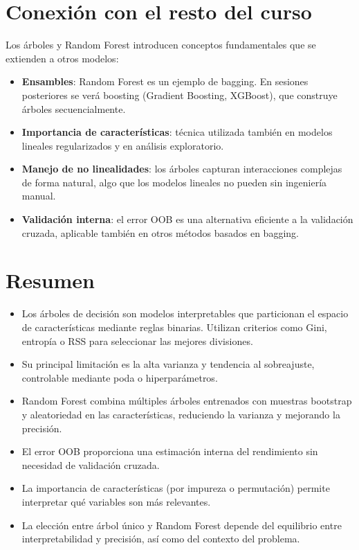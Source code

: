 \documentclass[12pt,a4paper,openany,oneside]{book}
\begin{document}
\section{Conexión con el resto del curso}
Los árboles y Random Forest introducen conceptos fundamentales que se extienden a otros modelos:
\begin{itemize}
    \item \textbf{Ensambles}: Random Forest es un ejemplo de bagging. En sesiones posteriores se verá boosting (Gradient Boosting, XGBoost), que construye árboles secuencialmente.
    \item \textbf{Importancia de características}: técnica utilizada también en modelos lineales regularizados y en análisis exploratorio.
    \item \textbf{Manejo de no linealidades}: los árboles capturan interacciones complejas de forma natural, algo que los modelos lineales no pueden sin ingeniería manual.
    \item \textbf{Validación interna}: el error OOB es una alternativa eficiente a la validación cruzada, aplicable también en otros métodos basados en bagging.
\end{itemize}

\section{Resumen}
\begin{itemize}
    \item Los árboles de decisión son modelos interpretables que particionan el espacio de características mediante reglas binarias. Utilizan criterios como Gini, entropía o RSS para seleccionar las mejores divisiones.
    \item Su principal limitación es la alta varianza y tendencia al sobreajuste, controlable mediante poda o hiperparámetros.
    \item Random Forest combina múltiples árboles entrenados con muestras bootstrap y aleatoriedad en las características, reduciendo la varianza y mejorando la precisión.
    \item El error OOB proporciona una estimación interna del rendimiento sin necesidad de validación cruzada.
    \item La importancia de características (por impureza o permutación) permite interpretar qué variables son más relevantes.
    \item La elección entre árbol único y Random Forest depende del equilibrio entre interpretabilidad y precisión, así como del contexto del problema.
\end{itemize}
\end{document}
